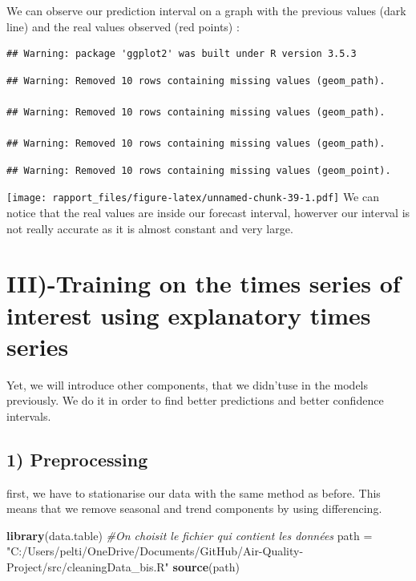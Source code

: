 \documentclass[]{article}
\newenvironment{Shaded}{\begin{snugshade}}{\end{snugshade}}
\newcommand{\KeywordTok}[1]{\textcolor[rgb]{0.13,0.29,0.53}{\textbf{#1}}}
\newcommand{\StringTok}[1]{\textcolor[rgb]{0.31,0.60,0.02}{#1}}
\newcommand{\CommentTok}[1]{\textcolor[rgb]{0.56,0.35,0.01}{\textit{#1}}}
\newcommand{\NormalTok}[1]{#1}
\begin{document}
We can observe our prediction interval on a graph with the previous
values (dark line) and the real values observed (red points) :

\begin{verbatim}
## Warning: package 'ggplot2' was built under R version 3.5.3
\end{verbatim}

\begin{verbatim}
## Warning: Removed 10 rows containing missing values (geom_path).

## Warning: Removed 10 rows containing missing values (geom_path).

## Warning: Removed 10 rows containing missing values (geom_path).
\end{verbatim}

\begin{verbatim}
## Warning: Removed 10 rows containing missing values (geom_point).
\end{verbatim}

\texttt{[image: rapport\_files/figure-latex/unnamed-chunk-39-1.pdf]} We
can notice that the real values are inside our forecast interval,
howerver our interval is not really accurate as it is almost constant
and very large.

\section{III)-Training on the times series of interest using explanatory times series}

Yet, we will introduce other components, that we didn'tuse in the models
previously. We do it in order to find better predictions and better
confidence intervals.

\subsection{1) Preprocessing}

first, we have to stationarise our data with the same method as before.
This means that we remove seasonal and trend components by using
differencing.

\begin{Shaded}
\begin{Highlighting}[]
\KeywordTok{library}\NormalTok{(data.table)}
\CommentTok{#On choisit le fichier qui contient les données}
\NormalTok{path =}\StringTok{ "C:/Users/pelti/OneDrive/Documents/GitHub/Air-Quality-Project/src/cleaningData_bis.R"}
\KeywordTok{source}\NormalTok{(path)}
\end{Highlighting}
\end{Shaded}
\end{document}
